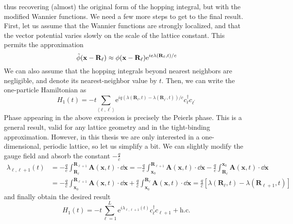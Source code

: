 thus recovering (almost) the original form of the hopping integral, but with the modified Wannier functions.
We need a few more steps to get to the final result. First, let us assume that the Wannier functions
are strongly localized, and that the vector potential varies slowly on the scale of the lattice constant.
This permits the approximation
\begin{equation}
    \Tilde{\phi}(\mathbf{x - \mathbf{R}_{\ell}}) \approx \phi(\mathbf{x - \mathbf{R}_{\ell}}) \mathrm{e}^{i e \lambda(\mathbf{R}_{\ell} ,t) / c}
\end{equation}
We can also assume that the hopping integrals beyond nearest neighbors are negligible, and denote
its nearest-neighbor value by \(t\). Then, we can write the one-particle Hamiltonian as
\begin{equation}
    H_1(t) = -t \sum_{\langle \ell,\ell^{\prime} \rangle } \mathrm{e}^{i q \left( \lambda(\mathbf{R}_{\ell},t) -
    \lambda (\mathbf{R}_{\ell^{\prime}},t) \right) /c } c^{\dag}_{\ell}c_{\ell^{\prime}}
\end{equation}
Phase appearing in the above expression is precisely the Peierls phase. This is a general result, valid for
any lattice geometry and in the tight-binding approximation. However, in this thesis we are only interested in a
one-dimensional, periodic lattice, so let us simplify a bit. We can slightly modify the gauge field
and absorb the constant \(-\frac{q}{c}\)
\begin{align}
    \lambda_{\ell,\ell+1}(t) & = -\frac{q}{c} \int_{\mathbf{R}_{\ell}}^{\mathbf{R}_{\ell+1}} \mathbf{A}(\mathbf{x},t)\cdot \dd{\mathbf{x}}
    = -\frac{q}{c} \int_{\mathbf{x}_0}^{\mathbf{R}_{\ell+1}}  \mathbf{A}(\mathbf{x},t) \cdot\dd{\mathbf{x}} - \frac{q}{c} \int_{\mathbf{R}_{\ell}}^{\mathbf{x}_0}  \mathbf{A}(\mathbf{x},t) \cdot\dd{\mathbf{x}} \nonumber              \\
                             & = -\frac{q}{c} \int^{\mathbf{R}_{\ell+1}}_{\mathbf{x}_0} \mathbf{A}(\mathbf{x},t) \cdot\dd{\mathbf{x}}+\frac{q}{c} \int_{\mathbf{x}_0}^{\mathbf{R}_{\ell}}  \mathbf{A}(\mathbf{x},t)\cdot\dd{\mathbf{x}}
    = \frac{q}{c}\left[ \lambda(\mathbf{R}_{\ell},t) - \lambda(\mathbf{R}_{\ell+1},t) \right]
    \label{eq:peierls_phase}
\end{align}
and finally obtain the desired result
\begin{equation}
    H_1(t) = -t \sum_{ \ell=1}^{L} \mathrm{e}^{i \lambda_{\ell,\ell+1}(t) } c^{\dag}_{\ell}c_{\ell+1} + \mathrm{h.c.}
    \label{eq:peierls_hamiltonian}
\end{equation}
